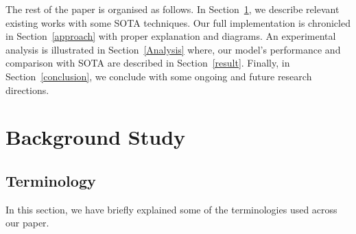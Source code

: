 \documentclass[pdflatex,sn-mathphys]{sn-jnl}%
\begin{document}
The rest of the paper is organised as follows. In Section~\ref{background}, we describe relevant existing works with some SOTA techniques. Our full implementation is chronicled in Section~\ref{approach} with proper explanation and diagrams. An experimental analysis is illustrated in Section~\ref{Analysis} where, our model's performance and comparison with SOTA are described in Section~\ref{result}. Finally, in Section~\ref{conclusion}, we conclude with some ongoing and future research directions.
\section{Background Study}
\label{background}
\subsection{Terminology} In this section, we have briefly explained some of the terminologies used across our paper.
\color{blue}
\end{document}
